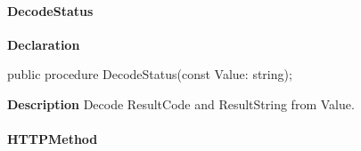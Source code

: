 \documentclass{report}
\newif\ifpdf
\begin{document}
\paragraph*{DecodeStatus}\hspace*{\fill}

\label{httpsend.THTTPSend-DecodeStatus}
\begin{list}{}{
\setlength{\itemindent}{0cm}
\setlength{\listparindent}{0cm}
\setlength{\leftmargin}{\evensidemargin}
\addtolength{\leftmargin}{\tmplength}
\settowidth{\labelsep}{X}
\addtolength{\leftmargin}{\labelsep}
\setlength{\labelwidth}{\tmplength}
}
\item[\textbf{Declaration}\hfill]
\ifpdf
\begin{flushleft}
\fi
\begin{ttfamily}
public procedure DecodeStatus(const Value: string);\end{ttfamily}

\ifpdf
\end{flushleft}
\fi

\par
\item[\textbf{Description}]
Decode ResultCode and ResultString from Value.

\end{list}
\paragraph*{HTTPMethod}\hspace*{\fill}
\end{document}
